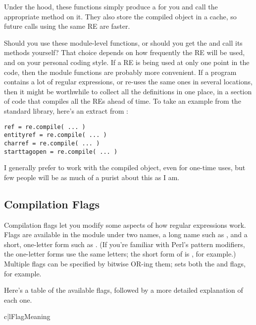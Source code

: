 \documentclass{howto}
\begin{document}
Under the hood, these functions simply produce a 
for you and call the appropriate method on it.  They also store the
compiled object in a cache, so future calls using the same
RE are faster.  

Should you use these module-level functions, or should you get the
 and call its methods yourself?  That choice
depends on how frequently the RE will be used, and on your personal
coding style.  If a RE is being used at only one point in the code,
then the module functions are probably more convenient.  If a program
contains a lot of regular expressions, or re-uses the same ones in
several locations, then it might be worthwhile to collect all the
definitions in one place, in a section of code that compiles all the
REs ahead of time.  To take an example from the standard library,
here's an extract from :

\begin{verbatim}
ref = re.compile( ... )
entityref = re.compile( ... )
charref = re.compile( ... )
starttagopen = re.compile( ... )
\end{verbatim}

I generally prefer to work with the compiled object, even for
one-time uses, but few people will be as much of a purist about this
as I am.

\subsection{Compilation Flags}

Compilation flags let you modify some aspects of how regular
expressions work.  Flags are available in the  module under
two names, a long name such as , and a short,
one-letter form such as .  (If you're familiar with Perl's
pattern modifiers, the one-letter forms use the same letters; the
short form of  is , for example.)
Multiple flags can be specified by bitwise OR-ing them;  sets both the  and  flags, for example.

Here's a table of the available flags, followed by
a more detailed explanation of each one.

\begin{tableii}{c|l}{}{Flag}{Meaning}
\end{tableii}
\end{document}

